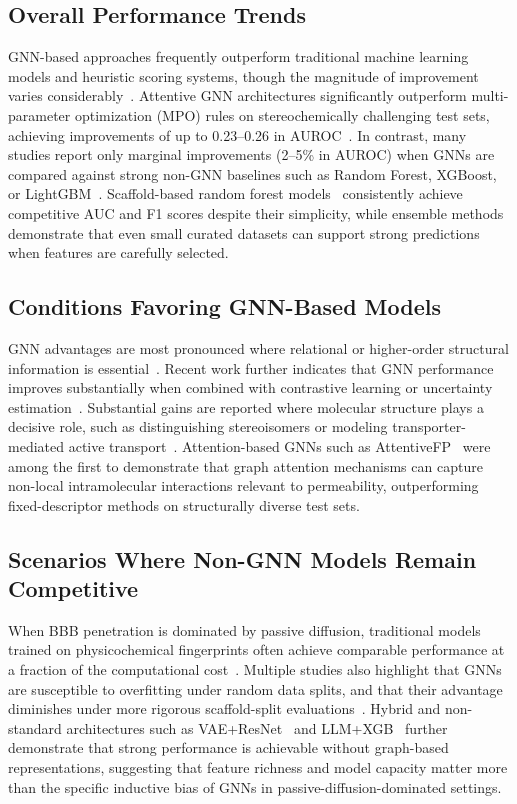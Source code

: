 \documentclass[conference]{IEEEtran}
\begin{document}
\subsection{Overall Performance Trends}

GNN-based approaches frequently outperform traditional machine learning
models and heuristic scoring systems, though the magnitude of
improvement varies considerably~\cite{Collins2024,Yu2022,Koutroumpa2025}.
Attentive GNN architectures significantly outperform multi-parameter optimization (MPO) rules on
stereochemically challenging test sets, achieving improvements of up to
0.23--0.26 in AUROC~\cite{Collins2024}. In contrast, many studies
report only marginal improvements (2--5\% in AUROC) when GNNs are
compared against strong non-GNN baselines such as Random Forest,
XGBoost, or LightGBM~\cite{Tang2022,Ding2022,Liu2021}.
Scaffold-based random forest models~\cite{Sakiyama2021,Sakiyama2023,Zhu2025}
consistently achieve competitive AUC and F1 scores despite their
simplicity, while ensemble methods~\cite{Plisson2019} demonstrate that
even small curated datasets can support strong predictions when features
are carefully selected.

\subsection{Conditions Favoring GNN-Based Models}

GNN advantages are most pronounced where relational or higher-order
structural information is essential~\cite{Collins2024,Ding2022}.
Recent work further indicates that GNN performance improves
substantially when combined with contrastive learning or uncertainty
estimation~\cite{Koutroumpa2025,Tong2022}.
Substantial gains are reported where molecular structure plays a
decisive role, such as distinguishing stereoisomers or modeling
transporter-mediated active transport~\cite{Collins2024,Ding2022}.
Attention-based GNNs such as AttentiveFP~\cite{Xiong2020} were among
the first to demonstrate that graph attention mechanisms can capture
non-local intramolecular interactions relevant to permeability,
outperforming fixed-descriptor methods on structurally diverse test sets.

\subsection{Scenarios Where Non-GNN Models Remain Competitive}

When BBB penetration is dominated by passive diffusion, traditional
models trained on physicochemical fingerprints often achieve comparable
performance at a fraction of the computational
cost~\cite{Zhu2025,Shaker2021,Sakiyama2021}. Multiple studies also
highlight that GNNs are susceptible to overfitting under random data
splits, and that their advantage diminishes under more rigorous
scaffold-split evaluations~\cite{Tong2022,Yu2022,Collins2024}.
Hybrid and non-standard architectures such as VAE+ResNet~\cite{Tevosyan2022}
and LLM+XGB~\cite{Huang2024} further demonstrate that strong performance
is achievable without graph-based representations, suggesting that feature
richness and model capacity matter more than the specific inductive bias
of GNNs in passive-diffusion-dominated settings.
\end{document}
